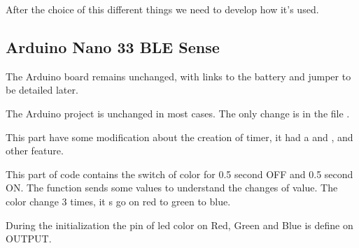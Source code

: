 After the choice of this different things we need to develop how it's used. 

\subsection{Arduino Nano 33 BLE Sense}

The Arduino board remains unchanged, with links to the battery and jumper to be detailed later. 

The Arduino project is unchanged in most cases. The only change is in the file .

\begin{center}
    \label{Code:ArduinoModif}
\end{center}

This part have some modification about the creation of timer, it had a  and , and other feature. 

\begin{center}
    \label{Code:ArduinoModif2}
\end{center}

This part of code contains the switch of color for 0.5 second OFF and 0.5 second ON. The function  sends some values to understand the changes of value. The color change 3 times, it s go on red to green to blue. 

\begin{center}
    \label{Code:ArduinoModif3}
\end{center}


During the initialization the pin of led color on Red, Green and Blue is define on OUTPUT. 


\begin{center}
    \label{Code:ArduinoModif4}
\end{center}

